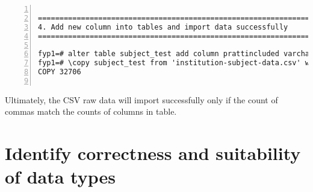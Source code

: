 \lstset{basicstyle=\ttfamily\tiny} 
\begin{lstlisting}[breaklines, frame=single, numbers=left, caption={Identify correctness of data types}, label=commandline-02]

========================================================================
4. Add new column into tables and import data successfully
========================================================================

fyp1=# alter table subject_test add column prattincluded varchar(20) null default null;
fyp1=# \copy subject_test from 'institution-subject-data.csv' with header csv;
COPY 32706


\end{lstlisting}

Ultimately, the CSV raw data will import successfully only if the count of commas match the counts of columns in table. 
\pagebreak

\section{Identify correctness and suitability of data types}


